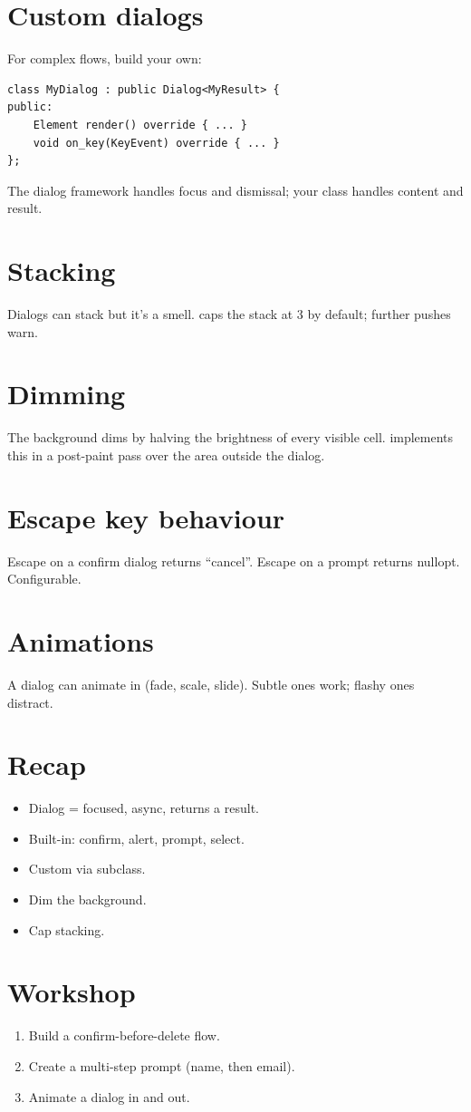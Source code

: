 \section{Custom dialogs}

For complex flows, build your own:

\begin{lstlisting}
class MyDialog : public Dialog<MyResult> {
public:
    Element render() override { ... }
    void on_key(KeyEvent) override { ... }
};
\end{lstlisting}

The dialog framework handles focus and dismissal; your
class handles content and result.

\section{Stacking}

Dialogs can stack but it's a smell. \maya{} caps the stack
at 3 by default; further pushes warn.

\section{Dimming}

The background dims by halving the brightness of every
visible cell. \maya{} implements this in a post-paint pass
over the area outside the dialog.

\section{Escape key behaviour}

Escape on a confirm dialog returns ``cancel''. Escape on a
prompt returns nullopt. Configurable.

\section{Animations}

A dialog can animate in (fade, scale, slide). Subtle ones
work; flashy ones distract.

\section{Recap}

\begin{recap}
\begin{itemize}[leftmargin=*]
  \item Dialog = focused, async, returns a result.
  \item Built-in: confirm, alert, prompt, select.
  \item Custom via subclass.
  \item Dim the background.
  \item Cap stacking.
\end{itemize}
\end{recap}

\section*{Workshop}

\begin{enumerate}[leftmargin=*]
  \item Build a confirm-before-delete flow.
  \item Create a multi-step prompt (name, then email).
  \item Animate a dialog in and out.
\end{enumerate}
